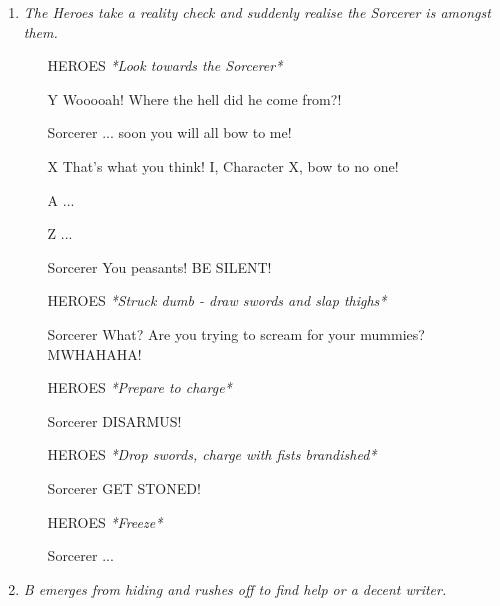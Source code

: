 \documentclass[10pt,a4paper]{article}
\newcommand{\note}[1]{\textit{#1}}
\newenvironment{sceneflow}{\begin{enumerate}[label=\roman*., leftmargin=0em]}{\end{enumerate}}
\newcommand{\voc}[1]{{\large{\color{Green}#1}}}
\newcommand{\act}[1]{{\large{\color{Red}\textit{*#1*}}}}
\begin{document}
\begin{enumerate}
\begin{sceneflow}
\begin{itemize}
\medskip
\voc{
X\&Y Line 1 \\
X\&Y Line 2 }
\item [Y] ... bla bla blah.
\item [X] \voc{Well, bla lah dah blah var zah maa.}
\item [Z] ...
\item [A] ...
\item [Y] ... woffle poffle toffle!
\item [X] \voc{Wha boo ya Z - gada nada fada zada - or zoor loor moor door!}
\item [X\&Y] \act{Guffaw}
\item [Y] ... Zoop wobity blobity!
\item [X] \voc{I'm sorry but I didn't understand any of that!}
\end{itemize}
\item \note{The Heroes take a reality check and suddenly realise the Sorcerer is amongst them.}
\begin{itemize}
\item [HEROES] \act{Look towards the Sorcerer}
\item [Y] Wooooah! Where the hell did he come from?!
\item [Sorcerer] ... soon you will all bow to me!
\item [X] \voc{That's what you think! I, Character X, bow to no one!}
\item [A] ...
\item [Z] ...
\item [Sorcerer] You peasants! BE SILENT!
\item [HEROES] \act{Struck dumb - draw swords and slap thighs}
\item [Sorcerer] What? Are you trying to scream for your mummies? MWHAHAHA!
\item [HEROES] \act{Prepare to charge}
\item [Sorcerer] DISARMUS!
\item [HEROES] \act{Drop swords, charge with fists brandished}
\item [Sorcerer] GET STONED!
\item [HEROES] \act{Freeze}
\item [Sorcerer] ...
\end{itemize}
\item \note{B emerges from hiding and rushes off to find help or a decent writer.}
\end{sceneflow}

% 
% 
\end{enumerate}
\end{document}
